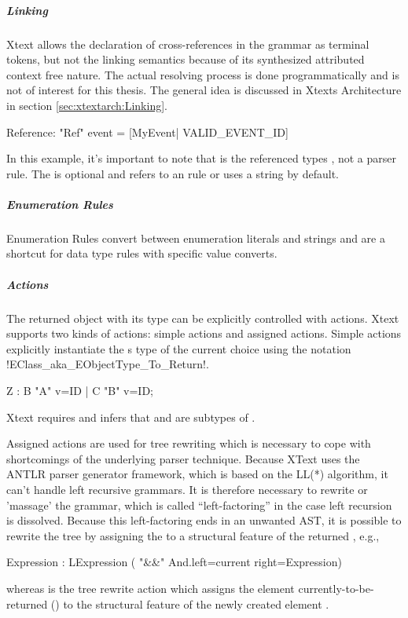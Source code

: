 \subparagraph{Linking}
Xtext allows the declaration of cross-references in the grammar as terminal tokens, but not the linking semantics because of its synthesized attributed context free nature. The actual resolving process is done programmatically and is not of interest for this thesis. The general idea is discussed in Xtexts Architecture in section \ref{sec:xtextarch:Linking}. 
\begin{xtxt}
Reference:  "Ref" event = [MyEvent| VALID_EVENT_ID]
\end{xtxt}
In this example, it's important to note that  is the referenced types , not a parser rule. The  is optional and refers to an  rule or uses a string by default.

\subparagraph{Enumeration Rules}
Enumeration Rules convert between enumeration literals and strings and are a shortcut for data type rules with specific value converts.

\subparagraph{Actions}
The returned object with its type can be explicitly controlled with actions. Xtext supports two kinds of actions: simple actions and assigned actions. Simple actions explicitly instantiate the s type of the current choice using the notation \kode!{EClass_aka_EObjectType_To_Return}!.
\begin{xtxt}
Z 	: 	{B} "A" v=ID
	| 	{C} "B" v=ID;
\end{xtxt}
Xtext requires and infers that  and  are subtypes of . 

Assigned actions are used for tree rewriting which is necessary to cope with shortcomings of the underlying parser technique. Because XText uses the ANTLR parser generator framework, which is based on the LL(*) algorithm, it can't handle left recursive grammars. It is therefore necessary to rewrite or 'massage' the grammar, which is called ``left-factoring'' in the case left recursion is dissolved. Because this left-factoring ends in an unwanted AST, it is possible to rewrite the tree by assigning the  to a structural feature of the returned , e.g., 
\begin{xtxt}
Expression 	: 	LExpression 
	 	( "&&" {And.left=current}  right=Expression)
\end{xtxt}
whereas  is the tree rewrite action which assigns the element currently-to-be-returned () to the structural feature  of the newly created element .


